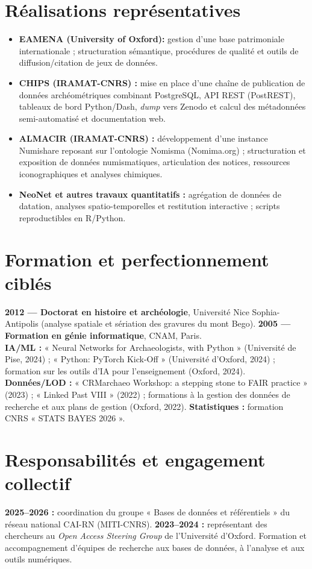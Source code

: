 \documentclass[10pt,a4paper]{article}
\begin{document}
\section*{Réalisations représentatives}
\begin{itemize}
\item \textbf{EAMENA (University of Oxford):} gestion d'une base patrimoniale internationale ; structuration sémantique, procédures de qualité et outils de diffusion/citation de jeux de données.
\item \textbf{CHIPS (IRAMAT-CNRS) :} mise en place d'une chaîne de publication de données archéométriques combinant PostgreSQL, API REST (PostREST), tableaux de bord Python/Dash, \textit{dump} vers Zenodo et calcul des métadonnées semi-automatisé et documentation web.
\item \textbf{ALMACIR (IRAMAT-CNRS) :} développement d'une instance Numishare reposant sur l'ontologie Nomisma (Nomima.org) ; structuration et exposition de données numismatiques, articulation des notices, ressources iconographiques et analyses chimiques.
\item \textbf{NeoNet et autres travaux quantitatifs :} agrégation de données de datation, analyses spatio-temporelles et restitution interactive ; scripts reproductibles en R/Python.
\end{itemize}

\section*{Formation et perfectionnement ciblés}
\textbf{2012 --- Doctorat en histoire et archéologie}, Université Nice Sophia-Antipolis (analyse spatiale et sériation des gravures du mont Bego). \textbf{2005 --- Formation en génie informatique}, CNAM, Paris.\\
\textbf{IA/ML :} « Neural Networks for Archaeologists, with Python » (Université de Pise, 2024) ; « Python: PyTorch Kick-Off » (Université d'Oxford, 2024) ; formation sur les outils d'IA pour l'enseignement (Oxford, 2024). \\
\textbf{Données/LOD :} « CRMarchaeo Workshop: a stepping stone to FAIR practice » (2023) ; « Linked Past VIII » (2022) ; formations à la gestion des données de recherche et aux plans de gestion (Oxford, 2022). \textbf{Statistiques :} formation CNRS « STATS BAYES 2026 ».

\section*{Responsabilités et engagement collectif}
\textbf{2025--2026 :} coordination du groupe « Bases de données et référentiels » du réseau national CAI-RN (MITI-CNRS). \textbf{2023--2024 :} représentant des chercheurs au \emph{Open Access Steering Group} de l'Université d'Oxford. Formation et accompagnement d'équipes de recherche aux bases de données, à l'analyse et aux outils numériques.
\end{document}
